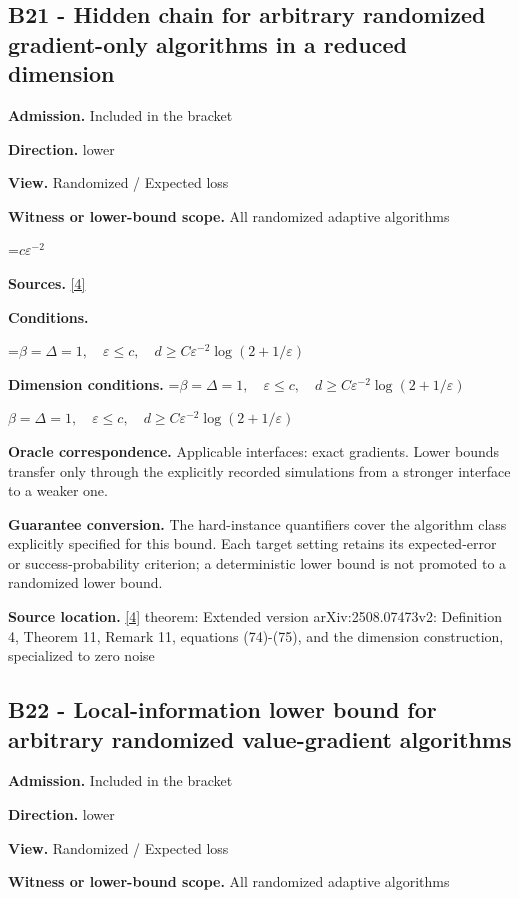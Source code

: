 \documentclass[10pt,a4paper]{article}
\newcommand{\AtlasMath}[1]{\par\begingroup\centering\setbox0=\hbox{$\displaystyle #1$}\ifdim\wd0>1.4\linewidth\typeout{ATLAS WIDE FORMULA: \the\wd0}\fi\ifdim\wd0>\linewidth\resizebox{\linewidth}{!}{\box0}\else\box0\fi\par\endgroup}
\newcommand{\AtlasInlineMath}[1]{\begingroup\setbox0=\hbox{$#1$}\ifdim\wd0>.4\linewidth\endgroup\AtlasMath{#1}\else\endgroup$#1$\fi}
\begin{document}
\subsection{B21 - Hidden chain for arbitrary randomized gradient-only algorithms in a reduced dimension}
\textbf{Admission.} Included in the bracket

\textbf{Direction.} lower

\textbf{View.} Randomized / Expected loss

\textbf{Witness or lower-bound scope.} All randomized adaptive algorithms

\AtlasMath{c\varepsilon^{-2}}
\textbf{Sources.} \href{https://proceedings.mlr.press/v313/liu26a.html}{[4]}

\textbf{Conditions.} 


\AtlasMath{\beta=\Delta=1,\quad\varepsilon\le c,\quad d\ge C\varepsilon^{-2}\log(2+1/\varepsilon)}




\textbf{Dimension conditions.} \AtlasInlineMath{\beta=\Delta=1,\quad\varepsilon\le c,\quad d\ge C\varepsilon^{-2}\log(2+1/\varepsilon)}

\textbf{Oracle correspondence.} Applicable interfaces: exact gradients. Lower bounds transfer only through the explicitly recorded simulations from a stronger interface to a weaker one.

\textbf{Guarantee conversion.} The hard-instance quantifiers cover the algorithm class explicitly specified for this bound. Each target setting retains its expected-error or success-probability criterion; a deterministic lower bound is not promoted to a randomized lower bound.

\textbf{Source location.} \href{https://proceedings.mlr.press/v313/liu26a.html}{[4]} theorem: Extended version arXiv:2508.07473v2: Definition 4, Theorem 11, Remark 11, equations (74)-(75), and the dimension construction, specialized to zero noise

\subsection{B22 - Local-information lower bound for arbitrary randomized value-gradient algorithms}
\textbf{Admission.} Included in the bracket

\textbf{Direction.} lower

\textbf{View.} Randomized / Expected loss

\textbf{Witness or lower-bound scope.} All randomized adaptive algorithms
\end{document}
